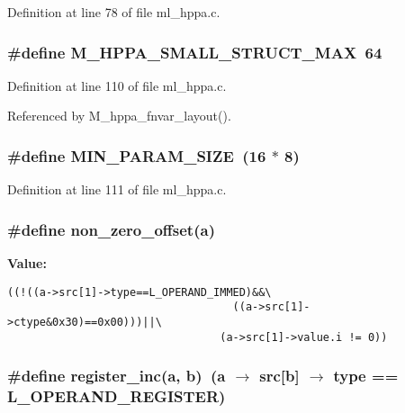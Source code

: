 Definition at line 78 of file ml\_\-hppa.c.
\subsubsection{\setlength{\rightskip}{0pt plus 5cm}\#define M\_\-HPPA\_\-SMALL\_\-STRUCT\_\-MAX~64}\label{ml__hppa_8c_dbd49a31b86218b95e339746c9e66fe7}




Definition at line 110 of file ml\_\-hppa.c.

Referenced by M\_\-hppa\_\-fnvar\_\-layout().
\subsubsection{\setlength{\rightskip}{0pt plus 5cm}\#define MIN\_\-PARAM\_\-SIZE~(16 $\ast$ 8)}\label{ml__hppa_8c_48f1f5d33d6770a468f7767465e07abb}




Definition at line 111 of file ml\_\-hppa.c.
\subsubsection{\setlength{\rightskip}{0pt plus 5cm}\#define non\_\-zero\_\-offset(a)}\label{ml__hppa_8c_1a7d03fa0a676d3b09e555d8c8176f1b}


\textbf{Value:}

\begin{Code}\begin{verbatim}((!((a->src[1]->type==L_OPERAND_IMMED)&&\
                                   ((a->src[1]->ctype&0x30)==0x00)))||\
                                 (a->src[1]->value.i != 0))
\end{verbatim}\end{Code}
\subsubsection{\setlength{\rightskip}{0pt plus 5cm}\#define register\_\-inc(a, b)~(a $\rightarrow$ src[b] $\rightarrow$ type == L\_\-OPERAND\_\-REGISTER)}\label{ml__hppa_8c_1e7b7d7ff33cab42b74ae66e888b1124}


